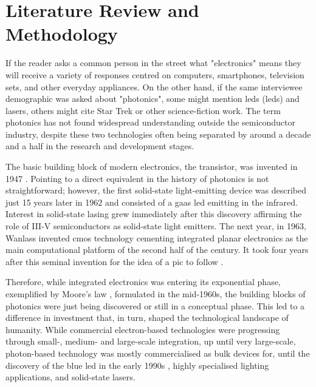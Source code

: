 \chapter{Literature Review and Methodology}
\label{chap:review}

If the reader asks a common person in the street what "electronics" means they will receive a variety of responses centred on computers, smartphones, television sets, and other everyday appliances. On the other hand, if the same interviewee demographic was asked about "photonics", some might mention \acl{led}s (\acs{led}s) and lasers, others might cite Star Trek or other science-fiction work. The term photonics has not found widespread understanding outside the semiconductor industry, despite these two technologies often being separated by around a decade and a half in the research and development stages. 

The basic building block of modern electronics, the transistor, was invented in 1947 \cite{Bardeen1948, Bardeen1950}. Pointing to a direct equivalent in the history of photonics is not straightforward; however, the first solid-state light-emitting device was described just \num{15} years later in 1962 \cite{Biard1966} and consisted of a \acf{gaas} \acs{led} emitting in the infrared. Interest in solid-state lasing grew immediately after this discovery \cite{Hall1962, Hall1963} affirming the role of III-V semiconductors as solid-state light emitters. The next year, in 1963, Wanlass invented \acf{cmos} technology \cite{Wanlass1967} cementing integrated planar electronics as the main computational platform of the second half of the century. It took four years after this seminal invention for the idea of a \acf{pic} to follow \cite{Miller1969}.

Therefore, while integrated electronics was entering its exponential phase, exemplified by Moore's law \cite{Moore1965}, formulated in the mid-1960s, the building blocks of photonics were just being discovered or still in a conceptual phase. This led to a difference in investment that, in turn, shaped the technological landscape of humanity. While commercial electron-based technologies were progressing through small-, medium- and large-scale integration, up until very large-scale, photon-based technology was mostly commercialised as bulk devices for, until the discovery of the blue \acs{led} in the early 1990s \cite{Nakamura1994}, highly specialised lighting applications, and solid-state lasers. 

